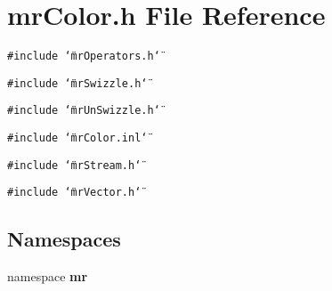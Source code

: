 \section{mr\-Color.h File Reference}
\label{mrColor_8h}
{\tt \#include \char`\"{}mr\-Operators.h\char`\"{}}\par
{\tt \#include \char`\"{}mr\-Swizzle.h\char`\"{}}\par
{\tt \#include \char`\"{}mr\-Un\-Swizzle.h\char`\"{}}\par
{\tt \#include \char`\"{}mr\-Color.inl\char`\"{}}\par
{\tt \#include \char`\"{}mr\-Stream.h\char`\"{}}\par
{\tt \#include \char`\"{}mr\-Vector.h\char`\"{}}\par
\subsection*{Namespaces}
\begin{CompactItemize}
\item 
namespace {\bf mr}
\end{CompactItemize}
